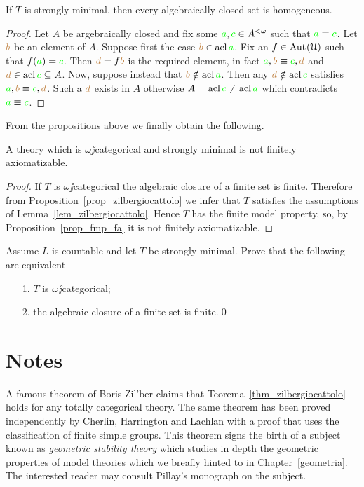 \documentclass[creche.tex]{subfiles}
\begin{document}
\begin{proposition}\label{prop_zilbergiocattolo} If $T$ is strongly minimal, then every algebraically closed set is homogeneous.
\end{proposition}
\begin{proof}
Let $A$ be argebraically closed and fix some ${\color{green} a},{\color{green} c}\in A^{<\omega}$ such that ${\color{green} a}\equiv{\color{green}c}$. Let ${\color{brown} b}$ be an element of $A$. Suppose first the case ${\color{brown} b}\in\mathop{\rm acl}{\color{green} a}$. Fix an $f\in\textrm{Aut\kern.15ex}(\EuScript U)$ such that $f({\color{green} a})={\color{green} c}$. Then ${\color{brown} d}=f{\color{brown} b}$ is the required element, in fact ${\color{green} a},{\color{brown} b}\equiv {\color{green}c},{\color{brown} d}$ and ${\color{brown} d}\in\mathop{\rm acl}{\color{green} c}\subseteq  A$. Now, suppose instead that ${\color{brown} b}\notin\mathop{\rm acl}{\color{green} a}$. Then any ${\color{brown} d}\notin\mathop{\rm acl}{\color{green} c}$ satisfies ${\color{green} a},{\color{brown} b}\equiv {\color{green}c},{\color{brown} d}$. Such a ${\color{brown} d}$ exists in $A$ otherwise $A=\mathop{\rm acl}{\color{green} c}\neq\mathop{\rm acl}{\color{green} a}$ which contradicts ${\color{green} a}\equiv {\color{green}c}$.
\end{proof}

From the propositions above we finally obtain the following.

\begin{theorem}\label{thm_zilbergiocattolo}
A theory which is $\omega\jj$categorical and strongly minimal is not finitely axiomatizable.
\end{theorem}

\begin{proof}
If $T$ is $\omega\jj$categorical the algebraic closure of a finite set is finite. Therefore from Proposition~\ref{prop_zilbergiocattolo} we infer that $T$ satisfies the assumptions of Lemma~\ref{lem_zilbergiocattolo}. Hence $T$ has the finite model property, so, by Proposition~\ref{prop_fmp_fa} it is not finitely axiomatizable.
\end{proof}


\begin{exercise} 
Assume $L$ is countable and let $T$ be strongly minimal. Prove that the following are equivalent
\begin{itemize}
\item[1.] $T$ is $\omega\jj$categorical;
\item[2.] the algebraic closure of a finite set is finite.\qed
\end{itemize}
\end{exercise}




\section{Notes}
A famous theorem of Boris Zil'ber claims that Teorema~\ref{thm_zilbergiocattolo} holds for any totally categorical theory. The same theorem has been proved independently by  Cherlin, Harrington and Lachlan with a proof that uses the classification of finite simple groups. This theorem signs the birth of a subject known as \textit{geometric stability theory\/} which studies in depth the geometric properties of model theories which we breafly hinted to in Chapter~\ref{geometria}. The interested reader may consult Pillay's monograph on the subject.
\end{document}
